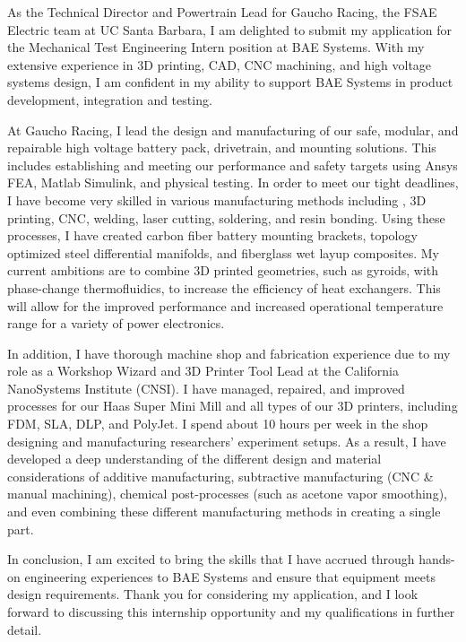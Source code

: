 \documentclass[11pt, letterpaper]{awesome-cv} %
\begin{document}
\makecvheader %

\makelettertitle %


\begin{cvletter}


As the Technical Director and Powertrain Lead for Gaucho Racing, the FSAE Electric team at UC Santa Barbara, I am delighted to submit my application for the Mechanical Test Engineering Intern position at BAE Systems. With my extensive experience in 3D printing, CAD, CNC machining, and high voltage systems design, I am confident in my ability to support BAE Systems in product development, integration and testing.

At Gaucho Racing, I lead the design and manufacturing of our safe, modular, and repairable high voltage battery pack, drivetrain, and mounting solutions. This includes establishing and meeting our performance and safety targets using Ansys FEA, Matlab Simulink, and physical testing. In order to meet our tight deadlines, I have become very skilled in various manufacturing methods including , 3D printing, CNC, welding, laser cutting, soldering, and resin bonding. Using these processes, I have created carbon fiber battery mounting brackets, topology optimized steel differential manifolds, and fiberglass wet layup composites. My current ambitions are to combine 3D printed geometries, such as gyroids, with phase-change thermofluidics, to increase the efficiency of heat exchangers. This will allow for the improved performance and increased operational temperature range for a variety of power electronics.

In addition, I have thorough machine shop and fabrication experience due to my role as a Workshop Wizard and 3D Printer Tool Lead at the California NanoSystems Institute (CNSI). I have managed, repaired, and improved processes for our Haas Super Mini Mill and all types of our 3D printers, including FDM, SLA, DLP, and PolyJet. I spend about 10 hours per week in the shop designing and manufacturing researchers' experiment setups. As a result, I have developed a deep understanding of the different design and material considerations of additive manufacturing, subtractive manufacturing (CNC \& manual machining), chemical post-processes (such as acetone vapor smoothing), and even combining these different manufacturing methods in creating a single part.

In conclusion, I am excited to bring the skills that I have accrued through hands-on engineering experiences to BAE Systems and ensure that equipment meets design requirements. Thank you for considering my application, and I look forward to discussing this internship opportunity and my qualifications in further detail.


\end{cvletter}


\makeletterclosing %
\end{document}
